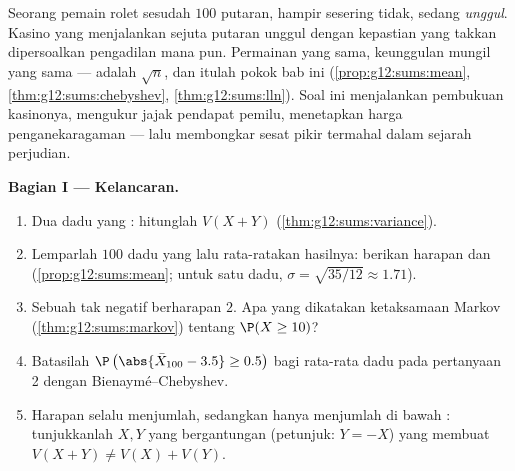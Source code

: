 \begin{problem}
\label{pb:g12:sums:1}
Seorang pemain rolet sesudah $100$ putaran, hampir sesering tidak,
sedang \emph{unggul}. Kasino yang menjalankan sejuta putaran unggul dengan
kepastian yang takkan dipersoalkan pengadilan mana pun. Permainan yang sama, keunggulan
mungil yang sama ---  adalah $\sqrt n$, dan itulah pokok bab
ini (\cref{prop:g12:sums:mean},
\cref{thm:g12:sums:chebyshev}, \cref{thm:g12:sums:lln}). Soal
ini menjalankan pembukuan kasinonya, mengukur jajak pendapat pemilu, menetapkan harga
penganekaragaman --- lalu membongkar sesat pikir termahal dalam
sejarah perjudian.

\medskip
\noindent\textbf{Bagian I --- Kelancaran.}
\begin{enumerate}
  \item Dua dadu yang : hitunglah $V(X + Y)$
        (\cref{thm:g12:sums:variance}).
  \item Lemparlah $100$ dadu yang  lalu rata-ratakan hasilnya:
        berikan harapan dan 
         (\cref{prop:g12:sums:mean}; untuk satu dadu,
        $\sigma = \sqrt{35/12} \approx 1.71$).
  \item Sebuah  tak negatif berharapan $2$.
        Apa yang dikatakan ketaksamaan Markov
        (\cref{thm:g12:sums:markov}) tentang
        $\P(X \geq 10)$?
  \item Batasilah $\P\left(\abs{\bar X_{100} - 3.5} \geq
        0.5\right)$ bagi rata-rata dadu pada pertanyaan 2 dengan
        Bienaymé--Chebyshev.
  \item Harapan selalu menjumlah, sedangkan  hanya menjumlah di bawah
        : tunjukkanlah $X, Y$ yang bergantungan (petunjuk:
        $Y = -X$) yang membuat
        $V(X + Y) \neq V(X) + V(Y)$.
\end{enumerate}


\end{problem}

